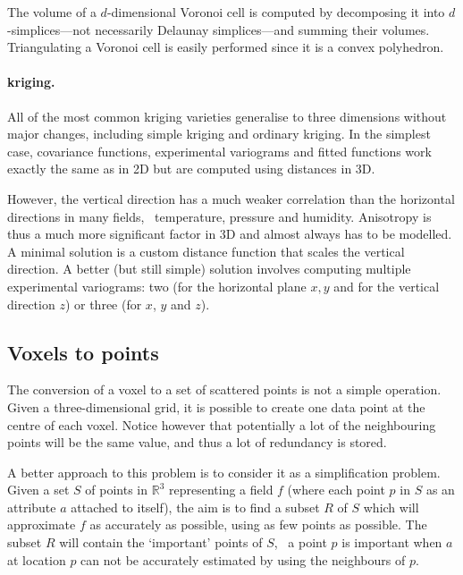 The volume of a $d$-dimensional Voronoi cell is computed by decomposing it into $d$-simplices---not necessarily Delaunay simplices---and summing their volumes. 
Triangulating a Voronoi cell is easily performed since it is a convex polyhedron.



\paragraph{kriging.}
All of the most common kriging varieties generalise to three dimensions without major changes, including simple kriging and ordinary kriging.
In the simplest case, covariance functions, experimental variograms and fitted functions work exactly the same as in 2D but are computed using distances in 3D.

However, the vertical direction has a much weaker correlation than the horizontal directions in many fields, \eg\ temperature, pressure and humidity.
Anisotropy is thus a much more significant factor in 3D and almost always has to be modelled.
A minimal solution is a custom distance function that scales the vertical direction.
A better (but still simple) solution involves computing multiple experimental variograms: two (for the horizontal plane \(x,y\) and for the vertical direction \(z\)) or three (for \(x\), \(y\) and \(z\)).



\subsection{Voxels to points}

The conversion of a voxel to a set of scattered points is not a simple operation.
Given a three-dimensional grid, it is possible to create one data point at the centre of each voxel.
Notice however that potentially a lot of the neighbouring points will be the same value, and thus a lot of redundancy is stored.

%

A better approach to this problem is to consider it as a simplification problem.%
Given a set $S$ of points in $\mathbb{R}^3$ representing a field $f$ (where each point $p$ in $S$ as an attribute $a$ attached to itself), the aim is to find a subset $R$ of $S$ which will approximate $f$ as accurately as possible, using as few points as possible. 
The subset $R$ will contain the `important' points of $S$, \ie\ a point $p$ is important when $a$ at location $p$ can not be accurately estimated by using the neighbours of $p$.

